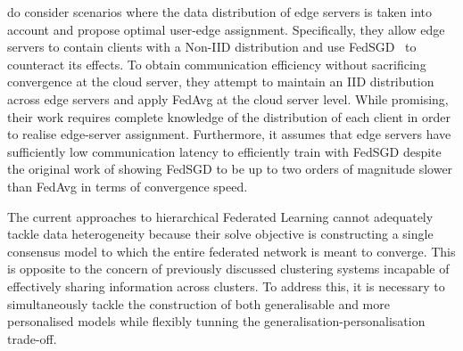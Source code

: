 \citet{OptimalUserEdgeAssingmentHierFL} do consider scenarios where the data distribution of edge servers is taken into account and propose optimal user-edge assignment. Specifically, they allow edge servers to contain clients with a Non-IID distribution and use FedSGD~\citep{FedAvg} to counteract its effects. To obtain communication efficiency without sacrificing convergence at the cloud server, they attempt to maintain an IID distribution across edge servers and apply FedAvg at the cloud server level. While promising, their work requires complete knowledge of the distribution of each client in order to realise edge-server assignment. Furthermore, it assumes that edge servers have sufficiently low communication latency to efficiently train with FedSGD despite the original work of \citet{FedAvg} showing FedSGD to be up to two orders of magnitude slower than FedAvg in terms of convergence speed.

The current approaches to hierarchical Federated Learning cannot adequately tackle data heterogeneity because their solve objective is constructing a single consensus model to which the entire federated network is meant to converge. This is opposite to the concern of previously discussed clustering systems incapable of effectively sharing information across clusters. To address this, it is necessary to simultaneously tackle the construction of both generalisable and more personalised models while flexibly tunning the generalisation-personalisation trade-off.




